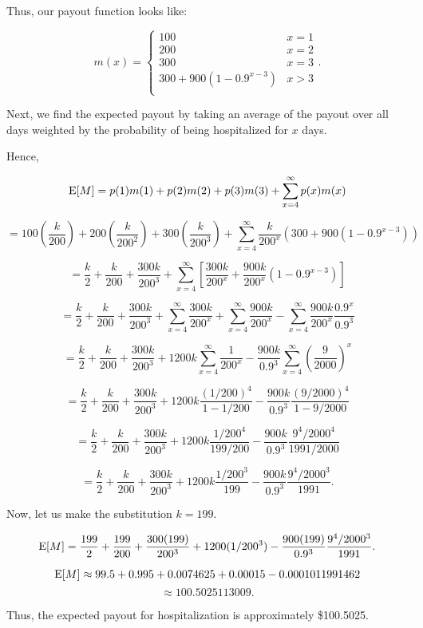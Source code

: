 \documentclass{report}
\begin{document}
Thus, our payout function looks like:


$$m(x)= \begin{cases}
  100 & x = 1 \\
  200 & x = 2 \\
  300 & x = 3 \\
  300 + 900(1-0.9^{x-3}) & x > 3 \\
\end{cases}.$$


Next, we find the expected payout by taking an average of the payout over all days  weighted by the probability of being hospitalized for $x$ days. \par


Hence,

$$ \operatorname{E}[M] =  p(1)m(1) +p(2)m(2) + p(3)m(3) + \sum_{x = 4}^{\infty}p(x)m(x) $$

$$  = 100\left(\frac{k}{200} \right) + 200\left(\frac{k}{200^2}\right) + 300\left(\frac{k}{200^3} \right) +  \sum_{x = 4}^{\infty} \frac{k}{200^x} (300 + 900(1-0.9^{x-3}))$$

$$  = \frac{k}{2}  + \frac{k}{200} + \frac{300k}{200^3} +  \sum_{x = 4}^{\infty}\left[ \frac{300k}{200^x} + \frac{900k}{200^x}(1-0.9^{x-3})\right]$$


$$  = \frac{k}{2}  + \frac{k}{200} + \frac{300k}{200^3} +  \sum_{x = 4}^{\infty} \frac{300k}{200^x} + \sum_{x = 4}^{\infty} \frac{900k}{200^x} - \sum_{x = 4}^{\infty} \frac{900k}{200^x} \frac{0.9^x}{0.9^3}$$

$$  = \frac{k}{2}  + \frac{k}{200} + \frac{300k}{200^3} + 1200k\sum_{x = 4}^{\infty} \frac{1}{200^x} - \frac{900k}{0.9^3}\sum_{x = 4}^{\infty} \left(\frac{9}{2000}\right)^x$$

$$  = \frac{k}{2}  + \frac{k}{200} + \frac{300k}{200^3} + 1200k \frac{\left(1/200\right)^4}{1 - 1/200} - \frac{900k}{0.9^3}\frac{(9/2000)^4}{ 1 -9/2000}$$

$$  = \frac{k}{2}  + \frac{k}{200} + \frac{300k}{200^3} + 1200k \frac{1/200^4}{199/200} - \frac{900k}{0.9^3}\frac{9^4/2000^4}{1991/2000}$$

$$  = \frac{k}{2}  + \frac{k}{200} + \frac{300k}{200^3} + 1200k \frac{1/200^3}{199} - \frac{900k}{0.9^3}\frac{9^4/2000^3}{1991}.$$

Now, let us make the substitution $k = 199.$


$$ \operatorname{E}[M]  = \frac{199}{2}  + \frac{199}{200} + \frac{300(199)}{200^3} + 1200 (1/200^3) - \frac{900(199)}{0.9^3}\frac{9^4/2000^3}{1991}.$$

$$ \operatorname{E}[M]  \approx 99.5  + 0.995 + 0.0074625 + 0.00015 - 0.0001011991462$$
$$ \approx 100.5025113009.$$


Thus, the expected payout for hospitalization is approximately \$100.5025.
\end{document}
